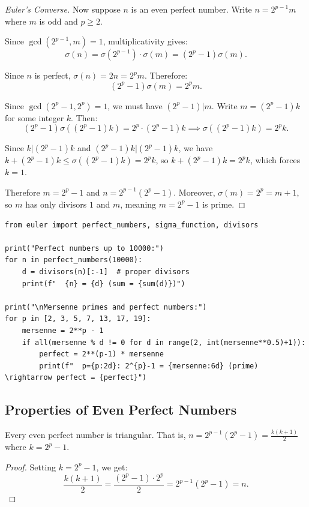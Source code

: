 \begin{proof}[Euler's Converse]
Now suppose $n$ is an even perfect number. Write $n = 2^{p-1}m$ where $m$ is odd and $p \geq 2$.

Since $\gcd(2^{p-1}, m) = 1$, multiplicativity gives:
\[
\sigma(n) = \sigma(2^{p-1}) \cdot \sigma(m) = (2^p - 1)\sigma(m).
\]

Since $n$ is perfect, $\sigma(n) = 2n = 2^p m$. Therefore:
\[
(2^p - 1)\sigma(m) = 2^p m.
\]

Since $\gcd(2^p - 1, 2^p) = 1$, we must have $(2^p - 1) | m$. Write $m = (2^p - 1)k$ for some integer $k$. Then:
\[
(2^p - 1)\sigma((2^p-1)k) = 2^p \cdot (2^p - 1)k \implies \sigma((2^p-1)k) = 2^p k.
\]

Since $k | (2^p - 1)k$ and $(2^p - 1)k | (2^p - 1)k$, we have $k + (2^p-1)k \leq \sigma((2^p-1)k) = 2^p k$, so $k + (2^p-1)k = 2^p k$, which forces $k = 1$.

Therefore $m = 2^p - 1$ and $n = 2^{p-1}(2^p - 1)$. Moreover, $\sigma(m) = 2^p = m + 1$, so $m$ has only divisors $1$ and $m$, meaning $m = 2^p - 1$ is prime.
\end{proof}

\begin{lstlisting}[caption={Finding perfect numbers}, label=lst:perfect]
from euler import perfect_numbers, sigma_function, divisors

print("Perfect numbers up to 10000:")
for n in perfect_numbers(10000):
    d = divisors(n)[:-1]  # proper divisors
    print(f"  {n} = {d} (sum = {sum(d)})")

print("\nMersenne primes and perfect numbers:")
for p in [2, 3, 5, 7, 13, 17, 19]:
    mersenne = 2**p - 1
    if all(mersenne % d != 0 for d in range(2, int(mersenne**0.5)+1)):
        perfect = 2**(p-1) * mersenne
        print(f"  p={p:2d}: 2^{p}-1 = {mersenne:6d} (prime) \rightarrow perfect = {perfect}")
\end{lstlisting}

\subsection{Properties of Even Perfect Numbers}

\begin{theorem}
Every even perfect number is triangular. That is, $n = 2^{p-1}(2^p - 1) = \frac{k(k+1)}{2}$ where $k = 2^p - 1$.
\end{theorem}

\begin{proof}
Setting $k = 2^p - 1$, we get:
\[
\frac{k(k+1)}{2} = \frac{(2^p-1) \cdot 2^p}{2} = 2^{p-1}(2^p - 1) = n.
\]
\end{proof}

